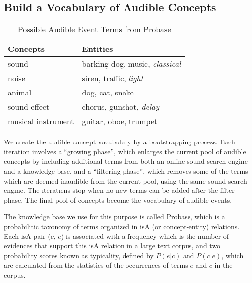\subsection{Build a Vocabulary of Audible Concepts}
\label{sec:vocab}

\begin{table}
\centering
\caption{Possible Audible Event Terms from Probase}
\label{tab:audible}
\small
\begin{tabular}{|l|l|} \hline
{\bf Concepts} & {\bf Entities} \\ \hline \hline
sound & barking dog, music, {\em classical}\\ \hline
noise & siren, traffic, {\em light} \\ \hline
animal & dog, cat, snake	\\ \hline
sound effect & chorus, gunshot, {\em delay}\\ \hline
musical instrument & 	guitar, oboe, trumpet \\ \hline
\end{tabular}
\end{table}

We create the audible concept vocabulary by a bootstrapping process.
Each iteration involves a ``growing phase'', which enlarges the 
current pool of audible concepts by including
additional terms from both an online sound search engine and a knowledge base,
and a ``filtering phase'', which removes some of the 
terms which are deemed inaudible from the current pool, 
using the same sound search engine.
The iterations stop when no new terms can be added after the filter phase. 
The final pool of concepts become the vocabulary of audible events.

The knowledge base we use for this purpose is called
Probase\cite{wu2012probase}, which is a probabilitic taxonomy of terms
organized in isA (or concept-entity) relations.
Each isA pair ($c$, $e$)
is associated with a frequency which is the
number of evidences that support this isA relation in a large text corpus, 
and two probability scores known as typicality, defined by
$P(e | c)$ and $P(c | e)$, which are calculated from the statistics of the
occurrences of terms $e$ and $c$ in the corpus.

